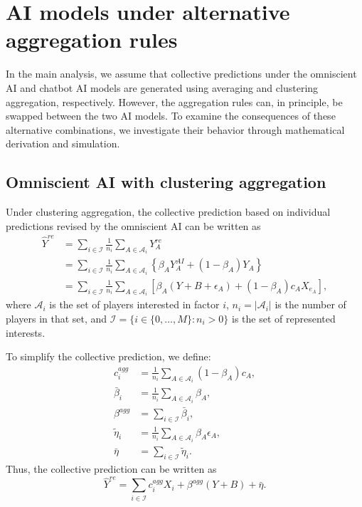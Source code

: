 \documentclass[12pt]{article}
\begin{document}
\section*{AI models under alternative aggregation rules}

In the main analysis, we assume that collective predictions under the omniscient AI and chatbot AI models are generated using averaging and clustering aggregation, respectively.
However, the aggregation rules can, in principle, be swapped between the two AI models.
To examine the consequences of these alternative combinations, we investigate their behavior through mathematical derivation and simulation.

\subsection*{Omniscient AI with clustering aggregation}

Under clustering aggregation, the collective prediction based on individual predictions revised by the omniscient AI can be written as
\begin{align}
\hat{Y}^{re}
&= \sum_{i \in \mathcal{I}}\frac{1}{n_i}\sum_{A \in \mathcal{A}_i}Y_A^{re}\\
&= \sum_{i \in \mathcal{I}}\frac{1}{n_i}\sum_{A \in \mathcal{A}_i}\left\{\beta_AY_A^{AI} + (1-\beta_A)Y_A\right\}\\
&= \sum_{i \in \mathcal{I}}\frac{1}{n_i}\sum_{A \in \mathcal{A}_i}\left[\beta_A(Y+B+\epsilon_A) + (1-\beta_A)c_AX_{e_A}\right],
\end{align}
where $\mathcal{A}_i$ is the set of players interested in factor $i$, $n_i=|\mathcal{A}_i|$ is the number of players in that set, and $\mathcal{I}=\{i\in\{0,\ldots,M\}:n_i>0\}$ is the set of represented interests.

To simplify the collective prediction, we define:
\begin{align}
c^{agg}_i &= \frac{1}{n_i}\sum_{A \in \mathcal{A}_i}(1-\beta_A)c_A,\\
\bar{\beta}_i &= \frac{1}{n_i}\sum_{A \in \mathcal{A}_i}\beta_A,\\
\beta^{agg} &= \sum_{i \in \mathcal{I}}\bar{\beta}_i,\\
\tilde{\eta}_i &= \frac{1}{n_i}\sum_{A \in \mathcal{A}_i}\beta_A\epsilon_A,\\
\bar{\eta} &= \sum_{i \in \mathcal{I}}\tilde{\eta}_i.
\end{align}
Thus, the collective prediction can be written as
\begin{equation}
\hat{Y}^{re}
= \sum_{i\in\mathcal{I}}c^{agg}_iX_i
+ \beta^{agg}(Y+B)
+ \bar{\eta}.
\end{equation}
\end{document}
